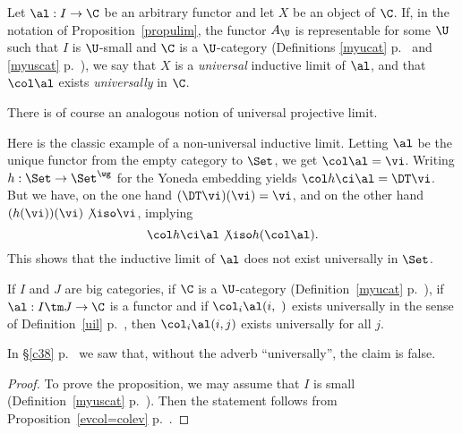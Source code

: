 \documentclass[12pt]{article}
\theoremstyle{remark}
\theoremstyle{definition}
\begin{document}
\begin{df} 
Let $\al:I\to\C$ be an arbitrary functor %
and let $X$ be an object of $\C$. %
If, in the notation of Proposition~\ref{propulim}, the functor $A_\U$ is representable for some $\U$ such that $I$ is $\U$-small and $\C$ is a $\U$-category (Definitions \ref{myucat} p.~ and \ref{myuscat} p.~), we say that $X$ %
is a {\em universal} inductive limit of $\al$, and that $\col\al$ exists {\em universally} in $\C$.
\end{df}

There is of course an analogous notion of universal projective limit. 

Here is the classic example of a non-universal inductive limit. Letting $\al$ be the unique functor from the empty category to $\Set$, we get $\col\al=\vi$. Writing $h:\Set\to\Set^\wg$ for the Yoneda embedding yields $\col h\ci\al=\DT\vi$. But we have, on the one hand $(\DT\vi)(\vi)=\vi$, and on the other hand $(h(\vi))(\vi)\not\iso\vi$, implying 
$$
\col h\ci\al\not\iso h(\col\al).
$$ 
This shows that the inductive limit of $\al$ does not exist universally in $\Set$.



\begin{s}
\begin{prop}
If $I$ and $J$ are big categories, if $\C$ is a $\U$-category (Definition~\ref{myucat} p.~), if $\al:I\tm J\to\C$ is a functor and if $\col_i\al(i,\ )$ exists universally in the sense of Definition~\ref{uil} p.~, then $\col_i\al(i,j)$ exists universally for all $j$. 
\end{prop}
In \S\ref{c38} p.~ we saw that, without the adverb ``universally'', the claim is false.
\begin{proof}
To prove the proposition, we may assume that $I$ is small (Definition~\ref{myuscat} p.~). %
Then the statement follows from Proposition~\ref{evcol=colev} p.~.
\end{proof}
\end{s}
\end{document}
